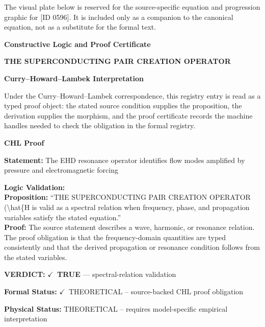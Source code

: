 \begingroup\footnotesize\sloppy
The visual plate below is reserved for the source-specific equation and progression graphic for [ID 0596]. It is included only as a companion to the canonical equation, not as a substitute for the formal text.
\par\endgroup
\ifTZPDarkEdition
{}
\fi

\clearpage
\begingroup\tzpsupportsetup
\noindent\textbf{\fontsize{10.8pt}{12.8pt}\selectfont [ID 0596] Constructive Logic and Proof Certificate}\par
\noindent\textbf{\fontsize{10pt}{12pt}\selectfont THE SUPERCONDUCTING PAIR CREATION OPERATOR}\par
\vspace{0.45em}
\begingroup
\footnotesize
\setlength{\parskip}{0.22em}
\setlength{\parindent}{0pt}
\noindent\textbf{Curry--Howard--Lambek Interpretation}\par
Under the Curry--Howard--Lambek correspondence, this registry entry is read as a typed proof
object: the stated source condition supplies the proposition, the derivation supplies the
morphism, and the proof certificate records the machine handles needed to check the obligation
in the formal registry.

\vspace{0.45em}
\noindent\textbf{CHL Proof}\par
\textbf{Statement:} The EHD resonance operator identifies flow modes amplified by pressure and
electromagnetic forcing

\textbf{Logic Validation:}\\
\textbf{Proposition:} ``THE SUPERCONDUCTING PAIR CREATION OPERATOR (\textbackslash{}hat\{H is valid as a spectral relation when
frequency, phase, and propagation variables satisfy the stated equation.''\\
\textbf{Proof:} The source statement describes a wave, harmonic, or resonance relation. The proof
obligation is that the frequency-domain quantities are typed consistently and that the
derived propagation or resonance condition follows from the stated variables.

\textbf{VERDICT:} \ensuremath{\checkmark}\ \textbf{TRUE} --- spectral-relation validation

\textbf{Formal Status:} \ensuremath{\checkmark}\ THEORETICAL -- source-backed CHL proof obligation

\textbf{Physical Status:} THEORETICAL -- requires model-specific empirical interpretation
\par\vspace{0.45em}
\par
\ifTZPDarkEdition
{}
\fi
\endgroup
\endgroup
